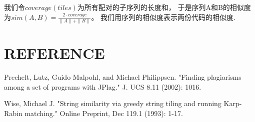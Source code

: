 \documentclass[UTF8]{article}
\begin{document}
\newpage
我们令$\textit{coverage}(tiles)$为所有配对的子序列的长度和，
于是序列A和B的相似度为$sim(A,B) = \frac{2 \cdot \textit{coverage}}{\| A \| + \| B \|}$。
我们用序列的相似度表示两份代码的相似度.

\section{REFERENCE}
Prechelt, Lutz, Guido Malpohl, and Michael Philippsen. "Finding plagiarisms among a set of programs with JPlag." J. UCS 8.11 (2002): 1016.

Wise, Michael J. "String similarity via greedy string tiling and running Karp-Rabin matching." Online Preprint, Dec 119.1 (1993): 1-17.
\end{document}
